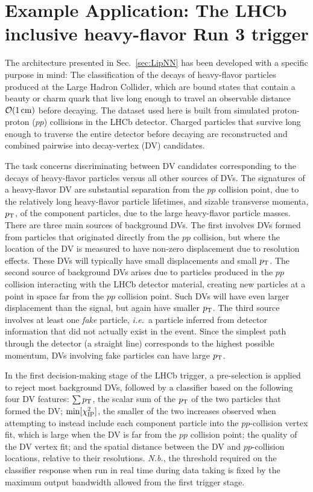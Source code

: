 \documentclass{article}
\begin{document}
\section{Example Application: The LHCb inclusive heavy-flavor Run 3 trigger}
\label{sec:HLT}

The architecture presented in Sec.~\ref{sec:LipNN} has been developed with a specific purpose in mind:
The classification of the decays of heavy-flavor particles produced at the Large Hadron Collider, which are bound states that contain a beauty or charm quark that live long enough to travel an observable distance $\mathcal{O}(1\,{\rm cm})$ before decaying.
The dataset used here is built from simulated
proton-proton ($pp$) collisions in the LHCb detector.
Charged particles that survive long enough to traverse the entire detector before decaying are reconstructed and combined pairwise
into decay-vertex (DV) candidates. 

The task concerns discriminating between DV candidates
corresponding to the decays of heavy-flavor particles  versus all other sources of DVs.
The signatures of a heavy-flavor DV are substantial separation from the $pp$ collision point, due to the relatively long heavy-flavor particle lifetimes, and sizable transverse momenta, $p_{\rm T}$, of the component particles, due to the large heavy-flavor particle masses.  
There are three main sources of background DVs.
The first involves DVs formed from particles that originated directly from the $pp$ collision, but where the location of the DV is measured to have non-zero displacement due to resolution effects. 
These DVs will typically have small displacements and small $p_{\rm T}$. 
The second source of background DVs arises due to particles produced in the $pp$ collision interacting with the LHCb detector material, creating new particles at a point in space far from the $pp$ collision point.
Such DVs will have even larger displacement than the signal, but again have smaller $p_{\rm T}$.
The third source involves at least one {\em fake} particle, {\em i.e.}\ a particle inferred from detector information that did not actually exist in the event. 
Since the simplest path through the detector (a straight line) corresponds to the highest possible momentum, DVs involving fake particles can have large $p_{\rm T}$. 


In the first decision-making stage of the LHCb trigger, a pre-selection is applied to reject most background DVs, followed by a classifier based on the following four DV features: 
$\sum p_{\rm T}$, the scalar sum of the $p_{\rm T}$ of the two particles that formed the DV;
${\rm min}[\chi^2_{\rm IP}]$, the smaller of the two increases observed when attempting to instead include each component particle into the $pp$-collision vertex fit, which is large when the DV is far from the $pp$ collision point;
the quality of the DV vertex fit;
and the spatial distance between the DV and $pp$-collision locations, relative to their resolutions. 
{\em N.b.}, the threshold required on the classifier response when run in real time during data taking is fixed by the maximum output bandwidth allowed from the first trigger stage. 
\end{document}
